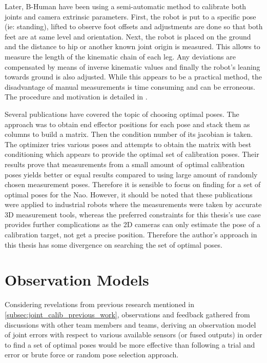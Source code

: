 \documentclass[english, printversion, nomenclature, notitle]{tuvisionthesis} %
\begin{document}
Later, B-Human have been using a semi-automatic method to calibrate both joints and camera extrinsic parameters. First, the robot is put to a specific pose (ie: standing), lifted to observe foot offsets and adjustments are done so that both feet are at same level and orientation. Next, the robot is placed on the ground and the distance to hip or another known joint origin is measured. This allows to measure the length of the kinematic chain of each leg. Any deviations are compensated by means of inverse kinematic values and finally the robot's leaning towards ground is also adjusted. While this appears to be a practical method, the disadvantage of manual measurements is time consuming and can be erroneous. The procedure and motivation is detailed in \cite{thomas_rofer_b-human_2018}. 

Several publications have covered the topic of choosing optimal poses. The approach was to obtain end effector positions for each pose and stack them as columns to build a matrix. Then the condition number of its jacobian is taken. The optimizer tries various poses and attempts to obtain the matrix with best conditioning which appears to provide the optimal set of calibration poses. Their results prove that measurements from a small amount of optimal calibration poses yields better or equal results compared to using large amount of randomly chosen measurement poses. Therefore it is sensible to focus on finding for a set of optimal poses for the Nao. However, it should be noted that these publications were applied to industrial robots where the measurements were taken by accurate 3D measurement tools, whereas the preferred constraints for this thesis's use case provides further complications as the 2D cameras can only estimate the pose of a calibration target, not get a precise position. Therefore the author's approach in this thesis has some divergence on searching the set of optimal poses.

\section{Observation Models}
Considering revelations from previous research mentioned in \cref{subsec:joint_calib_previous_work}, observations and feedback gathered from discussions with other team members and teams, deriving an observation model of joint errors with respect to various available sensors (or fused outputs) in order to find a set of optimal poses would be more effective than following a trial and error or brute force or random pose selection approach.
\end{document}
